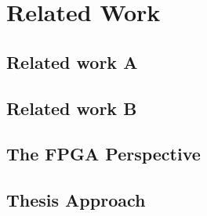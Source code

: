 \chapter{Related Work}
\label{Chapter-Related-Work}

\section{Related work A}
\section{Related work B}

\section{The FPGA Perspective}
\section{Thesis Approach}
